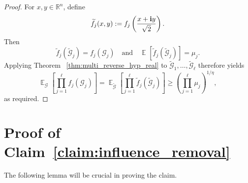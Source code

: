 \documentclass[11pt]{article}
\newcommand\Expect[2]{{\mathop{\mathbb{E}}_{#1}\left[ {#2} \right]}}
\renewcommand\geq{\geqslant}
\begin{document}
\begin{proof}
For $x,y\in\mathbb{R}^n$, define
\[
\widetilde f_j(x,y)
:=
f_j\left(\frac{x+{\bf i}y}{\sqrt{2}}\right).
\]
Then
\[
\widetilde f_j(\widetilde{\mathcal{G}}_j)
=
f_j(\mathcal{G}_j)
\quad\text{and}\quad
\Expect{}{
\widetilde f_j(\widetilde{\mathcal{G}}_j)}
=
\mu_j.
\]
Applying Theorem ~\ref{thm:multi_reverse_hyp_real} to
\(\widetilde{\mathcal{G}}_1,\ldots,\widetilde{\mathcal{G}}_\ell\)
therefore yields
\[
\Expect{\mathcal{G}}{
    \prod_{j=1}^{\ell}f_j(\mathcal{G}_j)
} = \Expect{\widetilde{\mathcal{G}}}{
    \prod_{j=1}^{\ell}\widetilde{f}_j(\widetilde{\mathcal{G}}_j)
}
\geq
\left(
    \prod_{j=1}^{\ell}\mu_j
\right)^{1/\eta},
\]
as required.
    
\end{proof}

\section{Proof of Claim~\ref{claim:influence_removal}}

   The following lemma will be crucial in proving the claim.
\end{document}
